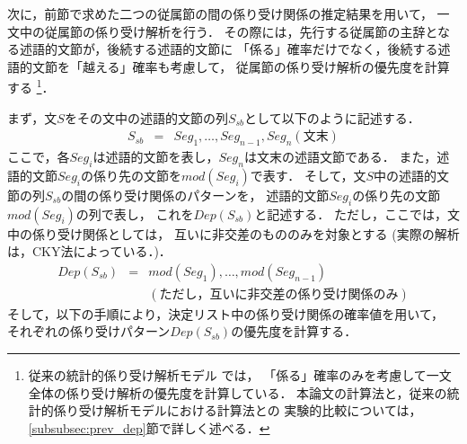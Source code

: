 次に，前節で求めた二つの従属節の間の係り受け関係の推定結果を用いて，
一文中の従属節の係り受け解析を行う．
その際には，先行する従属節の主辞となる述語的文節が，後続する述語的文節に
「係る」確率だけでなく，後続する述語的文節を「越える」確率も考慮して，
従属節の係り受け解析の優先度を計算する
\footnote{
   従来の統計的係り受け解析モデル
   \cite{Collins96a,Fujio97aj,Ehara98aj,Haruno98cj,Uchimoto98aj}では，
   「係る」確率のみを考慮して一文全体の係り受け解析の優先度を計算している．
   本論文の計算法と，従来の統計的係り受け解析モデルにおける計算法との
   実験的比較については，\ref{subsubsec:prev_dep}節で詳しく述べる．
}．


まず，文$S$をその文中の述語的文節の列$S_{sb}$として以下のように記述する．
\begin{eqnarray*}
  S_{sb} & = & Seg_1,\ldots,Seg_{n-1},Seg_n(文末) 
\end{eqnarray*}
ここで，各$Seg_i$は述語的文節を表し，$Seg_n$は文末の述語文節である．
また，述語的文節$Seg_i$の係り先の文節を$mod(Seg_i)$で表す．
そして，文$S$中の述語的文節の列$S_{sb}$の間の係り受け関係のパターンを，
述語的文節$Seg_i$の係り先の文節$mod(Seg_i)$の列で表し，
これを$Dep(S_{sb})$と記述する．
ただし，ここでは，文中の係り受け関係としては，
互いに非交差のもののみを対象とする
(実際の解析は，CKY法によっている．)．
\begin{eqnarray*}
  Dep(S_{sb}) & = & mod(Seg_1),\ldots,mod(Seg_{n-1}) \\
	& & (ただし，互いに非交差の係り受け関係のみ)
\end{eqnarray*}
そして，以下の手順により，決定リスト中の係り受け関係の確率値を用いて，
それぞれの係り受けパターン$Dep(S_{sb})$の優先度を計算する．

